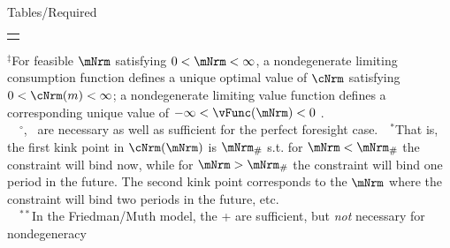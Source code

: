 \documentclass[\econtexRoot/BufferStockTheory]{subfiles}
\providecommand{\TblName}{}
\renewcommand{\TblName}{Required}
\begin{document}
\begin{verbatimwrite}{Tables/\TblName}
\begin{table}
{\begin{tabular}{|l|l|l|}
        \\ \hline \multicolumn{3}{c}{}
      \end{tabular}
    } %

    \settowidth\TableWidth{\usebox{\TblBox}}
    \savebox{\TblShrunkBox}{
      \settowidth{\TblShrunk}{\usebox{\TblBox}}
      \resizebox{\textwidth}{!}{\begin{minipage}{\TblShrunk}
          \usebox{\TblBox}
        \end{minipage}}
    }

    \usebox{\TblShrunkBox}


    \parbox{\textwidth}{\raggedright \footnotesize         $^{\ddagger}$For feasible $\mNrm$ satisfying $0 < \mNrm < \infty$, a nondegenerate limiting consumption function defines a unique optimal value of $\cNrm$ satisfying $0 < \cNrm(m) < \infty$; a nondegenerate limiting value function defines a corresponding unique value of $-\infty < \vFunc(\mNrm) < 0$ .\\
      ~~$^{\circ}${\RIC}, \FHWC~are necessary as well as sufficient for the perfect foresight case.~~$^{\ast}$That is, the first kink point in $\cNrm(\mNrm)$ is $\mNrm_{\#}$ s.t.
for $\mNrm < \mNrm_{\#}$ the constraint will bind now, while for $\mNrm > \mNrm_{\#}$ the constraint will bind one period in the future.
The second kink point corresponds to the $\mNrm$ where the constraint will bind two periods in the future, etc.\\
      ~~$^{\ast\ast}$In the Friedman/Muth model, the {\RIC}+{\FHWC} are sufficient, but \textit{not} necessary for nondegeneracy} 
  \end{table}
  
\end{verbatimwrite}
\clearpage

\end{document}
